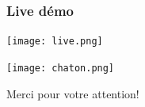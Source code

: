 \documentclass{beamer}
\begin{document}
\begin{frame}
\frametitle{Live démo}
\begin{center}
\texttt{[image: live.png]}
\end{center}
\end{frame}

\begin{frame}
\begin{center}
\texttt{[image: chaton.png]}
\end{center}
\begin{center}
Merci pour votre attention!
\end{center}

\end{frame}
\end{document}
